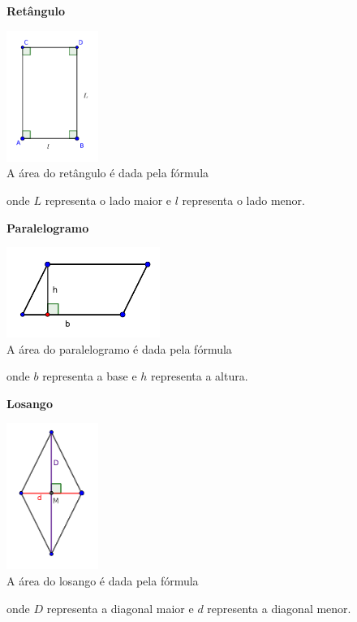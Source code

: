 \textbf{Retângulo}
\begin{multicols}{2}
\includegraphics[width=3cm]{./cap_geometria/figs/retangulo_L} \\
A área do retângulo é dada pela fórmula


onde $L$ representa o lado maior e $l$ representa o lado menor.
\end{multicols}

\textbf{Paralelogramo}
\begin{multicols}{2}
\includegraphics[width=5cm]{./cap_geometria/figs/paralelogramoL} \\
A área do paralelogramo é dada pela fórmula


onde $b$ representa a base e $h$ representa a altura.
\end{multicols}

\newpage

\textbf{Losango}
\begin{multicols}{2}
\includegraphics[width=3cm]{./cap_geometria/figs/losangoL} \\
A área do losango é dada pela fórmula


onde $D$ representa a diagonal maior e $d$ representa a diagonal menor.
\end{multicols}

